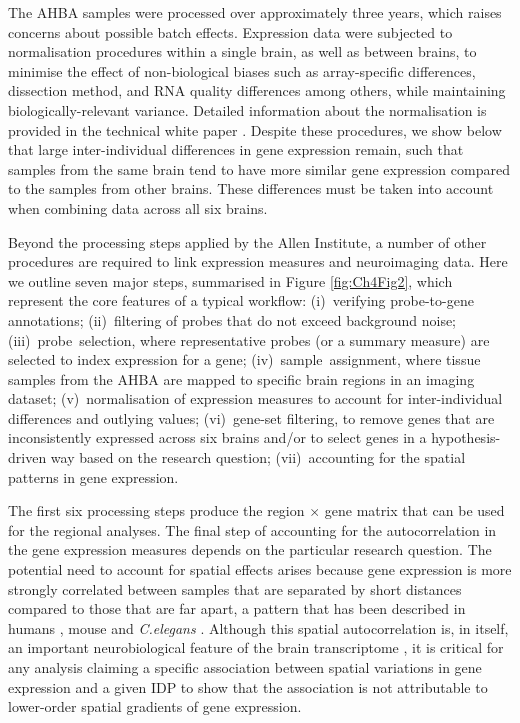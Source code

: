 The AHBA samples were processed over approximately three years, which raises concerns about possible batch effects. Expression data were subjected to normalisation procedures within a single brain, as well as between brains, to minimise the effect of non-biological biases such as array-specific differences, dissection method, and RNA quality differences among others, while maintaining biologically-relevant variance. Detailed information about the normalisation is provided in the technical white paper \citep{AHBAdoc}. Despite these procedures, we show below that large inter-individual differences in gene expression remain, such that samples from the same brain tend to have more similar gene expression compared to the samples from other brains. These differences must be taken into account when combining data across all six brains.

Beyond the processing steps applied by the Allen Institute, a number of other procedures are required to link expression measures and neuroimaging data. Here we outline seven major steps, summarised in Figure \ref{fig:Ch4Fig2}, which represent the core features of a typical workflow:
\mbox{(i) verifying} probe-to-gene annotations;
\mbox{(ii) filtering} of probes that do not exceed background noise;
\mbox{(iii) probe selection}, where representative probes (or a summary measure) are selected to index expression for a gene;
\mbox{(iv) sample assignment}, where tissue samples from the AHBA are mapped to specific brain regions in an imaging dataset;
\mbox{(v) normalisation} of expression measures to account for inter-individual differences and outlying values;
\mbox{(vi) gene-set} filtering, to remove genes that are inconsistently expressed across six brains and/or to select genes in a hypothesis-driven way based on the research question;
\mbox{(vii) accounting} for the spatial patterns in gene expression.

The first six processing steps produce the region $\times$ gene matrix that can be used for the regional analyses.
The final step of accounting for the autocorrelation in the gene expression measures depends on the particular research question.
The potential need to account for spatial effects arises because gene expression is more strongly correlated between samples that are separated by short distances compared to those that are far apart, a pattern that has been described in humans
\mbox{\citep{Richiardi2015,Krienen2016,Vertes2016b,Pantazatos2017}}, mouse \mbox{\citep{Fulcher2016}} and \textit{C.elegans} \citep{Arnatkeviciute2018}.
Although this spatial autocorrelation is, in itself, an important neurobiological feature of the brain transcriptome \mbox{\citep{Gryglewski2018, Fornito2019}},
it is critical for any analysis claiming a specific association between spatial variations in gene expression and a given IDP to show that the association is not attributable to lower-order spatial gradients of gene expression.

